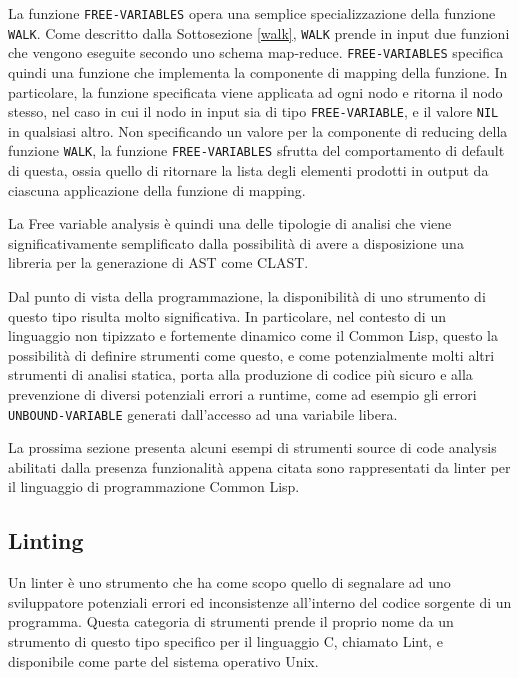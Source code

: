 La funzione \texttt{FREE-VARIABLES} opera una semplice specializzazione della
funzione \texttt{WALK}. Come descritto dalla Sottosezione \ref{walk},
\texttt{WALK} prende in input due funzioni che vengono eseguite secondo uno
schema map-reduce. \texttt{FREE-VARIABLES} specifica quindi una funzione che
implementa la componente di mapping della funzione. In particolare, la funzione
specificata viene applicata ad ogni nodo e ritorna il nodo stesso, nel caso in
cui il nodo in input sia di tipo \texttt{FREE-VARIABLE}, e il valore
\texttt{NIL} in qualsiasi altro. Non specificando un valore per la componente di
reducing della funzione \texttt{WALK}, la funzione \texttt{FREE-VARIABLES}
sfrutta del comportamento di default di questa, ossia quello di ritornare la
lista degli elementi prodotti in output da ciascuna applicazione della funzione
di mapping.

La Free variable analysis è quindi una delle tipologie di analisi che viene
significativamente semplificato dalla possibilità di avere a disposizione una
libreria per la generazione di AST come CLAST.

Dal punto di vista della programmazione, la disponibilità di uno strumento di
questo tipo risulta molto significativa. In particolare, nel contesto di un
linguaggio non tipizzato e fortemente dinamico come il Common Lisp, questo la
possibilità di definire strumenti come questo, e come potenzialmente molti altri
strumenti di analisi statica, porta alla produzione di codice più sicuro e alla
prevenzione di diversi potenziali errori a runtime, come ad esempio gli errori
\texttt{UNBOUND-VARIABLE} generati dall'accesso ad una variabile libera.

La prossima sezione presenta alcuni esempi di strumenti source di code analysis
abilitati dalla presenza funzionalità appena citata sono rappresentati da linter
per il linguaggio di programmazione Common Lisp.

\subsection{Linting}

Un linter è uno strumento che ha come scopo quello di segnalare ad uno
sviluppatore potenziali errori ed inconsistenze all'interno del codice sorgente
di un programma. Questa categoria di strumenti prende il proprio nome da un
strumento di questo tipo specifico per il linguaggio C, chiamato Lint, e
disponibile come parte del sistema operativo Unix. \cite{johnson1977lint}

